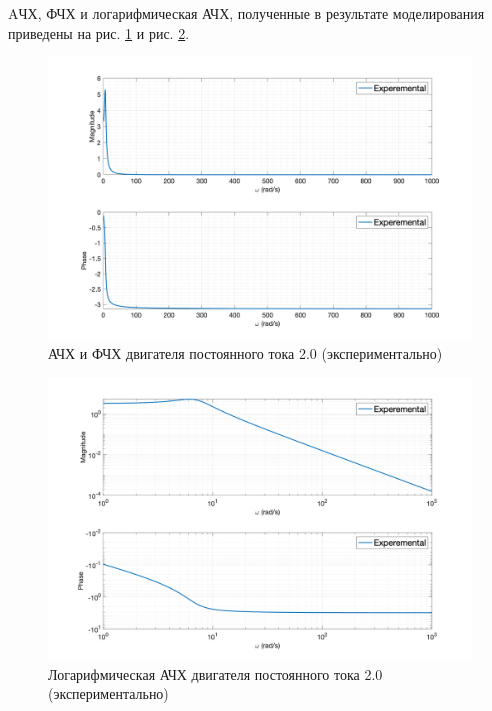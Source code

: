 AЧХ, ФЧХ и логарифмическая АЧХ, полученные в результате моделирования приведены на рис. \ref{fig:task2_freq_resp_exp_lin} и рис. \ref{fig:task2_freq_resp_exp_loglog}.
\begin{figure}[ht!]
    \centering
    \includegraphics[width=\textwidth]{media/plots/task2_freq_resp_exp_lin.png}
    \caption{АЧХ и ФЧХ двигателя постоянного тока 2.0 (экспериментально)}
    \label{fig:task2_freq_resp_exp_lin}
\end{figure}
\begin{figure}[ht!]
    \centering
    \includegraphics[width=\textwidth]{media/plots/task2_freq_resp_exp_loglog.png}
    \caption{Логарифмическая АЧХ двигателя постоянного тока 2.0 (экспериментально)}
    \label{fig:task2_freq_resp_exp_loglog}
\end{figure}

